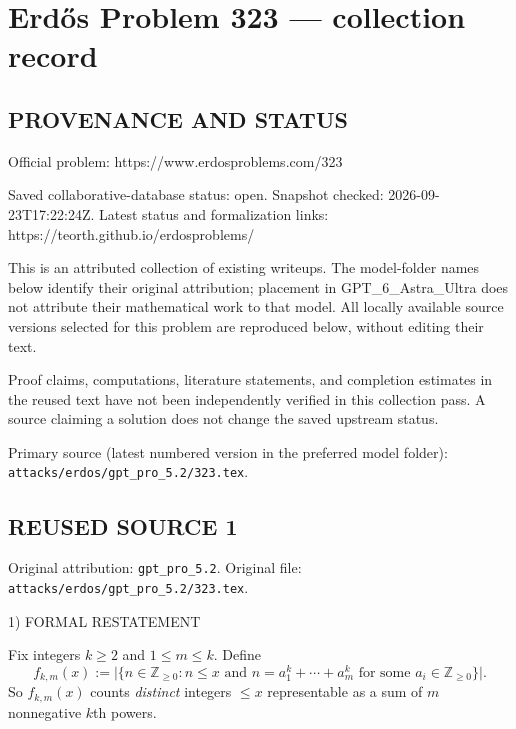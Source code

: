 \section*{Erd\H{o}s Problem 323 --- collection record}

\subsection*{PROVENANCE AND STATUS}
Official problem: https://www.erdosproblems.com/323

Saved collaborative-database status: open.
Snapshot checked: 2026-09-23T17:22:24Z.
Latest status and formalization links: https://teorth.github.io/erdosproblems/

This is an attributed collection of existing writeups. The model-folder names below identify their original attribution; placement in GPT\_6\_Astra\_Ultra does not attribute their mathematical work to that model. All locally available source versions selected for this problem are reproduced below, without editing their text.

Proof claims, computations, literature statements, and completion estimates in the reused text have not been independently verified in this collection pass. A source claiming a solution does not change the saved upstream status.

Primary source (latest numbered version in the preferred model folder): \texttt{attacks/erdos/gpt\_pro\_5.2/323.tex}.

\subsection*{REUSED SOURCE 1}
Original attribution: \texttt{gpt\_pro\_5.2}.
Original file: \texttt{attacks/erdos/gpt\_pro\_5.2/323.tex}.


1) FORMAL RESTATEMENT

Fix integers $k\ge 2$ and $1\le m\le k$.
Define
\[
f_{k,m}(x):=\bigl|\{n\in\mathbb Z_{\ge 0}: n\le x\text{ and }n=a_1^k+\cdots+a_m^k\text{ for some }a_i\in\mathbb Z_{\ge 0}\}\bigr|.
\]
So $f_{k,m}(x)$ counts \emph{distinct} integers $\le x$ representable as a sum of $m$ nonnegative $k$th powers.

